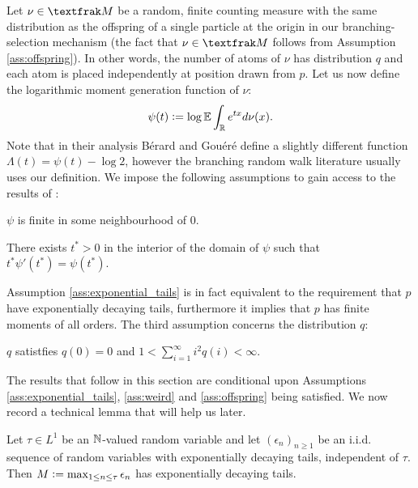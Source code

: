 Let $\nu \in \frak{M}$ be a random, finite counting measure with the same distribution as the offspring of a single particle at the origin in our branching-selection mechanism (the fact that $\nu \in \frak{M}$ follows from Assumption \ref{ass:offspring}). In other words, the number of atoms of $\nu$ has distribution $q$ and each atom is placed independently at position drawn from $p$. Let us now define the logarithmic moment generation function of $\nu$: 
\begin{equation*}
\psi(t) \vcentcolon= \log \mathbb{E}\int_{\mathbb{R}} e^{tx} d\nu (x).  
\end{equation*}
Note that in their analysis Bérard and Gouéré define a slightly different function $\Lambda(t) = \psi(t) - \log 2$, however the branching random walk literature usually uses our definition. We impose the following assumptions to gain access to the results of \cite{gantert2008asymptotics}:
\begin{assumption}\label{ass:exponential_tails}
$\psi$ is finite in some neighbourhood of $0$. 
\end{assumption}
\begin{assumption}\label{ass:weird}
There exists $t^* > 0$ in the interior of the domain of $\psi$ such that $t^*\psi'(t^*) = \psi(t^*)$. 
\end{assumption}

Assumption \ref{ass:exponential_tails} is in fact equivalent to the requirement that $p$ have exponentially decaying tails, furthermore it implies that $p$ has finite moments of all orders. The third assumption concerns the distribution $q$: 
\begin{assumption}\label{ass:offspring}
$q$ satistfies $q(0) = 0$ and $1 < \sum_{i = 1}^\infty i^2 q(i) < \infty$. 
\end{assumption}

The results that follow in this section are conditional upon Assumptions \ref{ass:exponential_tails}, \ref{ass:weird} and \ref{ass:offspring} being satisfied. We now record a technical lemma that will help us later. \\
\begin{lemma}\label{lem:ExpTailsMax}
Let $\tau \in L^1$ be an $\mathbb{N}$-valued random variable and let $(\epsilon_n)_{n \geq 1}$ be an i.i.d. sequence of random variables with exponentially decaying tails, independent of $\tau$. Then $M \vcentcolon= \max_{1 \leq n \leq \tau} \epsilon_n$ has exponentially decaying tails. 
\end{lemma}

